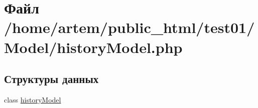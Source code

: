 \hypertarget{history_model_8php}{\section{Файл /home/artem/public\-\_\-html/test01/\-Model/history\-Model.php}
\label{history_model_8php}
}
\subsection*{Структуры данных}
\begin{DoxyCompactItemize}
\item 
class \hyperlink{classhistory_model}{history\-Model}
\end{DoxyCompactItemize}
